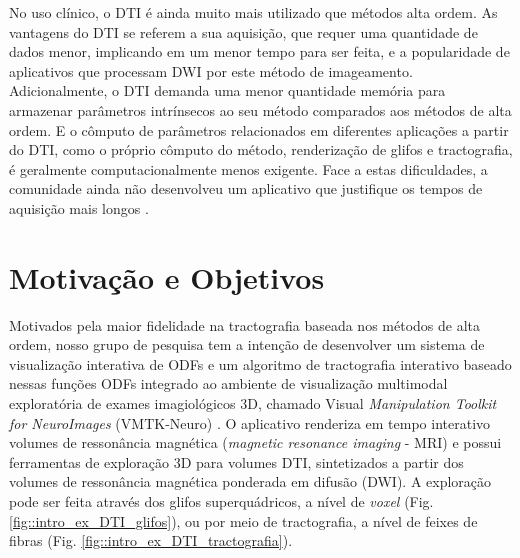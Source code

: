 \documentclass[
    12pt,                %
    oneside,            %
    a4paper,            %
    english,            %
    french,                %
    spanish,            %
    brazil                %
    ]{abntex2}
\begin{document}
No uso clínico, o DTI é ainda muito mais utilizado que métodos alta ordem. As vantagens do DTI se referem a sua aquisição, que requer uma quantidade de dados menor, implicando em um menor tempo para ser feita, e a popularidade de aplicativos que processam DWI por este método de imageamento. Adicionalmente, o DTI demanda uma menor quantidade memória para armazenar parâmetros intrínsecos ao seu método comparados aos métodos de alta ordem. E o cômputo de parâmetros relacionados em diferentes aplicações a partir do DTI, como o próprio cômputo do método, renderização de glifos e tractografia, é geralmente computacionalmente menos exigente. Face a estas dificuldades, a comunidade ainda não desenvolveu  um aplicativo que justifique os tempos de aquisição mais longos \cite{descoteaux2015}.








\section{Motivação e Objetivos}
\label{ssec:motivation}

Motivados pela maior fidelidade na tractografia baseada nos métodos de alta ordem, nosso grupo de pesquisa tem a intenção de desenvolver um sistema de visualização interativa de ODFs e um algoritmo de tractografia interativo baseado nessas funções ODFs integrado ao ambiente de visualização multimodal  exploratória de exames imagiológicos 3D, chamado Visual \textit{Manipulation Toolkit for NeuroImages} (VMTK-Neuro) \cite{VMTKNeuro}.  O aplicativo renderiza em tempo interativo volumes de ressonância magnética (\textit{magnetic resonance imaging} - MRI) e possui ferramentas de exploração 3D para volumes DTI, sintetizados a partir dos volumes de ressonância magnética ponderada em difusão (DWI). A exploração pode ser feita através dos glifos superquádricos, a nível de \textit{voxel} (Fig. \ref{fig::intro_ex_DTI_glifos}), ou por meio de tractografia, a nível de feixes de fibras (Fig. \ref{fig::intro_ex_DTI_tractografia}).
\end{document}
